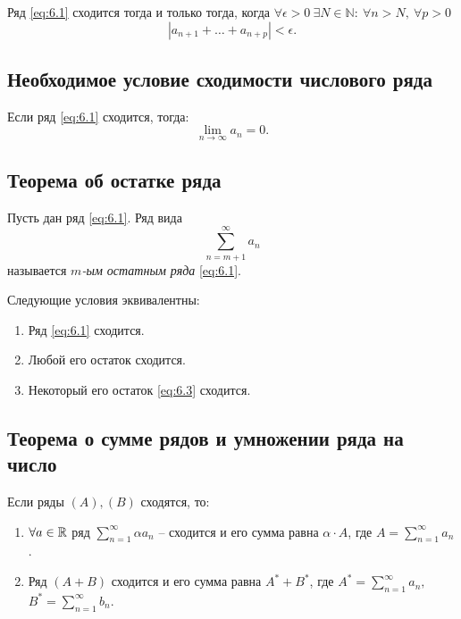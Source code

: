 \begin{theorem}
    Ряд \ref{eq:6.1} сходится тогда и только тогда, когда $\forall \epsilon > 0 \ \exists N \in \mathbb{N}: \ \forall n > N, \ \forall p > 0$
    \[
        |a_{n+1} + \ldots + a_{n+p}| < \epsilon.
    \]
\end{theorem}

\subsection{Необходимое условие сходимости числового ряда}

\begin{theorem}
    Если ряд \ref{eq:6.1} сходится, тогда:
    \[
        \underset{n\rightarrow\infty}{\lim}a_n = 0.
    \]
\end{theorem}

\subsection{Теорема об остатке ряда}

\begin{definition}
    Пусть дан ряд \ref{eq:6.1}. Ряд вида
    \begin{equation}\label{eq:6.3}
        \sum_{n=m+1}^{\infty}a_n
    \end{equation}
    называется \emph{$ m $-ым остатным ряда} \ref{eq:6.1}.
\end{definition}

\begin{theorem}
    Следующие условия эквивалентны:
    \begin{enumerate}
        \item Ряд \ref{eq:6.1} сходится.
        \item Любой его остаток сходится.
        \item Некоторый его остаток \ref{eq:6.3} сходится.
    \end{enumerate}
\end{theorem}

\subsection{Теорема о сумме рядов и умножении ряда на число}

\begin{theorem}
    Если ряды $ (A),(B) $ сходятся, то:
    \begin{enumerate}
        \item $ \forall a \in \mathbb{R} $ ряд $ \sum_{n=1}^{\infty}\alpha a_n $ -- сходится и его сумма равна $ \alpha \cdot A $, где $ A = \sum_{n=1}^{\infty}a_n $.

        \item Ряд $ (A+B) $ сходится и его сумма равна $ A^* + B^* $, где $ A^* = \sum_{n=1}^{\infty}a_n,$ $ B^* = \sum_{n=1}^{\infty}b_n $.
    \end{enumerate}
\end{theorem}


